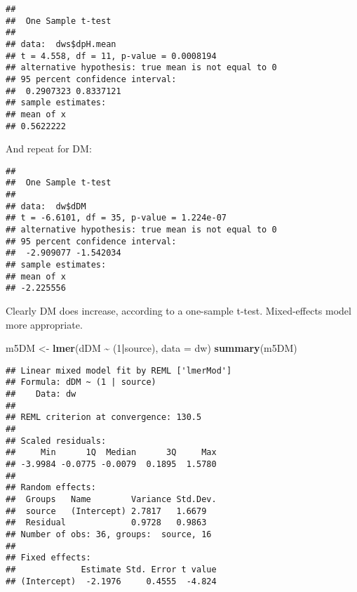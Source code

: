 \documentclass[
]{article}
\newenvironment{Shaded}{\begin{snugshade}}{\end{snugshade}}
\newcommand{\AttributeTok}[1]{\textcolor[rgb]{0.13,0.29,0.53}{#1}}
\newcommand{\DecValTok}[1]{\textcolor[rgb]{0.00,0.00,0.81}{#1}}
\newcommand{\FunctionTok}[1]{\textcolor[rgb]{0.13,0.29,0.53}{\textbf{#1}}}
\newcommand{\NormalTok}[1]{#1}
\newcommand{\OtherTok}[1]{\textcolor[rgb]{0.56,0.35,0.01}{#1}}
\newcommand{\SpecialCharTok}[1]{\textcolor[rgb]{0.81,0.36,0.00}{\textbf{#1}}}
\begin{document}
\begin{Shaded}
\end{Shaded}

\begin{verbatim}
## 
##  One Sample t-test
## 
## data:  dws$dpH.mean
## t = 4.558, df = 11, p-value = 0.0008194
## alternative hypothesis: true mean is not equal to 0
## 95 percent confidence interval:
##  0.2907323 0.8337121
## sample estimates:
## mean of x 
## 0.5622222
\end{verbatim}

And repeat for DM:

\begin{Shaded}
\end{Shaded}

\begin{verbatim}
## 
##  One Sample t-test
## 
## data:  dw$dDM
## t = -6.6101, df = 35, p-value = 1.224e-07
## alternative hypothesis: true mean is not equal to 0
## 95 percent confidence interval:
##  -2.909077 -1.542034
## sample estimates:
## mean of x 
## -2.225556
\end{verbatim}

Clearly DM does increase, according to a one-sample t-test.
Mixed-effects model more appropriate.

\begin{Shaded}
\begin{Highlighting}[]
\NormalTok{m5DM }\OtherTok{\textless{}{-}} \FunctionTok{lmer}\NormalTok{(dDM }\SpecialCharTok{\textasciitilde{}}\NormalTok{ (}\DecValTok{1}\SpecialCharTok{|}\NormalTok{source), }\AttributeTok{data =}\NormalTok{ dw)}
\FunctionTok{summary}\NormalTok{(m5DM)}
\end{Highlighting}
\end{Shaded}

\begin{verbatim}
## Linear mixed model fit by REML ['lmerMod']
## Formula: dDM ~ (1 | source)
##    Data: dw
## 
## REML criterion at convergence: 130.5
## 
## Scaled residuals: 
##     Min      1Q  Median      3Q     Max 
## -3.9984 -0.0775 -0.0079  0.1895  1.5780 
## 
## Random effects:
##  Groups   Name        Variance Std.Dev.
##  source   (Intercept) 2.7817   1.6679  
##  Residual             0.9728   0.9863  
## Number of obs: 36, groups:  source, 16
## 
## Fixed effects:
##             Estimate Std. Error t value
## (Intercept)  -2.1976     0.4555  -4.824
\end{verbatim}
\end{document}
